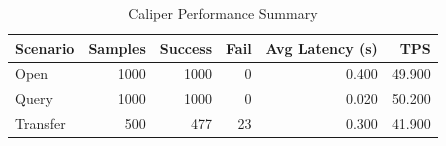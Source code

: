 \begin{table}
\caption{Caliper Performance Summary}
\label{tab:caliper_round}
\begin{tabular}{lrrrrr}
\toprule
Scenario & Samples & Success & Fail & Avg Latency (s) & TPS \\
\midrule
Open & 1000 & 1000 & 0 & 0.400 & 49.900 \\
Query & 1000 & 1000 & 0 & 0.020 & 50.200 \\
Transfer & 500 & 477 & 23 & 0.300 & 41.900 \\
\bottomrule
\end{tabular}
\end{table}
